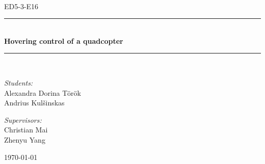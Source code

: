 \newcommand{\HRule}{\rule{\linewidth}{0.5 mm}}
\begin{titlepage}

\begin{center}
\\[0.5cm]

\textsc{\Large ED5-3-E16}\\[0.6cm]

\HRule \\[0.9cm]
{ \Huge \bfseries Hovering control of a quadcopter }\\[0.4cm]

\HRule \\[0.5cm]


\begin{minipage}{0.49\textwidth}
\begin{flushleft} \large
\emph{Students:}\\
Alexandra Dorina Török\\
Andrius Kul\v sinskas\\
\end{flushleft}
\end{minipage}
\begin{minipage}{0.49\textwidth}
\begin{flushright} \large
\emph{Supervisors:} \\
Christian Mai\\
Zhenyu Yang\\
\end{flushright}
\end{minipage}

\vfill

{\large \today}



\end{center}

\end{titlepage}
